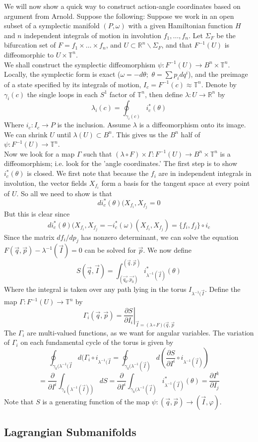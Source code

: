 \documentclass{article}
\begin{document}
\indent We will now show a quick way to construct action-angle coordinates based on argument from Arnold. Suppose the following: Suppose we work in an open subset of a symplectic manifold $(P,\omega)$ with a given Hamiltonian function $H$ and $n$ independent integrals of motion in involution $f_1, \ldots, f_n$. Let $\Sigma_F$ be the bifurcation set of $F= f_1 \times \ldots \times f_n$, and $U \subset \mathbb{R}^n \backslash \Sigma_F$, and that $F^{-1}(U)$ is diffeomorphic to $U \times \mathbb{T}^n$.\\
\indent We shall construct the symplectic diffeomorphism $\psi: F^{-1}(U) \to B^n \times \mathbb{T}^n$. Locally, the symplectic form is exact ($\omega = - d \theta; \hspace{4pt} \theta = \sum p_i dq^i$), and the preimage of a state specified by its integrals of motion, $I_c = F^{-1}(c) \approx \mathbb{T}^n$. Denote by $\gamma_i(c)$ the single loops in each $S^1$ factor of $\mathbb{T}^n$, then define $\lambda: U \to \mathbb{R}^n$ by 
\[ \lambda_i(c) = \oint_{\gamma_i(c)} i_c^*(\theta)  \]
\indent Where $i_c: I_c \to P$ is the inclusion. Assume $\lambda$ is a diffeomorphism onto its image. We can shrink $U$ until $\lambda(U) \subset B^n$. This gives us the $B^n$ half of $\psi: F^{-1}(U) \to \mathbb{T}^n$.\\
\indent Now we look for a map $\Gamma$ such that $(\lambda \circ F) \times \Gamma: F^{-1}(U) \to B^n \times \mathbb{T}^n$ is a diffeomorphism; i.e. look for the 'angle coordinates.' The first step is to show $i^*_c(\theta)$ is closed. We first note that because the $f_i$ are in independent integrals in involution, the vector fields $X_{f_i}$ form a basis for the tangent space at every point of $U$. So all we need to show is that
\[ di^*_c(\theta) (X_{f_i}, X_{f_j} =0 \]
But this is clear since
\[ di^*_c(\theta)(X_{f_i},X_{f_j} = -i^*_c(\omega)(X_{f_i},X_{f_j}) = \{f_i,f_j\}\circ i_c \]
Since the matrix $df_i/dp_j$ has nonzero determinant, we can solve the equation $F(\vec{q},\vec{p})-\lambda^{-1}(\vec{I})=0$ can be solved for $\vec{p}$. We now define
\[ S(\vec{q},\vec{I}) = \int_{(\vec{q_0},\vec{p_0})}^{(\vec{q},\vec{p})} i^*_{\lambda^{-1}(\vec{I})}(\theta)  \]
Where the integral is taken over any path lying in the torus $I_{\lambda^{-1}(\vec{I}}$. Define the map $\Gamma: F^{-1}(U) \to \mathbb{T}^n$ by 
\[ \Gamma_i(\vec{q},\vec{p}) = \left. \frac{\partial S}{\partial I_i}\right|_{\vec{I}=(\lambda \circ F)(\vec{q},\vec{p}}  \]
The $\Gamma_i$ are multi-valued functions, as we want for angular variables. The variation of $\Gamma_i$ on each fundamental cycle of the torus is given by
\[\oint_{\gamma_k(\lambda^{-1}(\vec{I}}d(\Gamma_i \circ i_{\lambda^{-1}(\vec{I}}=\oint_{\gamma_k(\lambda^{-1}(\vec{I})} d \left( \frac{\partial S}{\partial I^i} \circ i_{\lambda^{-1}(\vec{I})} \right)\]
\[= \frac{\partial}{\partial I^i} \int_{\gamma_k(\lambda^{-1}(\vec{I}))}dS = \frac{\partial}{\partial I^i} \int_{\gamma_k(\lambda^{-1}(\vec{I})} i^*_{\lambda^{-1}(\vec{I})} (\theta) = \frac{\partial I^k}{\partial I_j}\] 
Note that $S$ is a generating function of the map $\psi: (\vec{q},\vec{p}) \to (\vec{I}, \varphi)$.


\subsection{Lagrangian Submanifolds}
\end{document}
